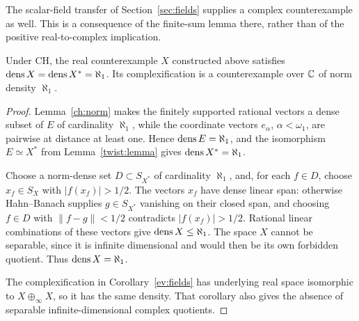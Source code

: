 The scalar-field transfer of Section~\ref{sec:fields} supplies a
complex counterexample as well. This is a consequence of the finite-sum
lemma there, rather than of the positive real-to-complex implication.

\begin{corollary}\label{twist:density}
Under CH, the real counterexample $X$ constructed above satisfies
$\operatorname{dens} X=\operatorname{dens} X^*=\aleph_1$. Its complexification is a counterexample
over $\mathbb C$ of norm density $\aleph_1$.
\end{corollary}

\begin{proof}
Lemma~\ref{ch:norm} makes the finitely supported rational vectors a
dense subset of $E$ of cardinality $\aleph_1$, while the coordinate
vectors $e_\alpha$, $\alpha<\omega_1$, are pairwise at distance at
least one. Hence $\operatorname{dens} E=\aleph_1$, and the isomorphism $E\simeq X^*$
from Lemma~\ref{twist:lemma} gives $\operatorname{dens} X^*=\aleph_1$.

Choose a norm-dense set $D\subset S_{X^*}$ of cardinality $\aleph_1$,
and, for each $f\in D$, choose $x_f\in S_X$ with $|f(x_f)|>1/2$.
The vectors $x_f$ have dense linear span: otherwise Hahn--Banach
supplies $g\in S_{X^*}$ vanishing on their closed span, and choosing
$f\in D$ with $\|f-g\|<1/2$ contradicts $|f(x_f)|>1/2$.
Rational linear combinations of these vectors give $\operatorname{dens} X\le\aleph_1$.
The space $X$ cannot be separable, since it is infinite dimensional
and would then be its own forbidden quotient. Thus $\operatorname{dens} X=\aleph_1$.

The complexification in Corollary~\ref{ev:fields} has underlying real
space isomorphic to $X\oplus_\infty X$, so it has the same density.
That corollary also gives the absence of separable infinite-dimensional
complex quotients.
\end{proof}
